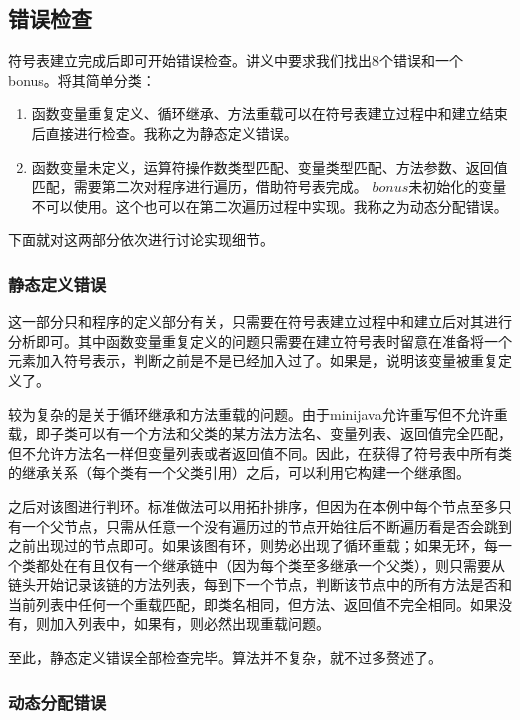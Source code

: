 \documentclass[10pt,a4paper]{article}
\begin{document}
\subsection{错误检查}

符号表建立完成后即可开始错误检查。讲义中要求我们找出8个错误和一个\\bonus。将其简单分类：
\begin{enumerate}
	\item 函数变量重复定义、循环继承、方法重载可以在符号表建立过程中和建立结束后直接进行检查。我称之为静态定义错误。
	\item 函数变量未定义，运算符操作数类型匹配、变量类型匹配、方法参数、返回值匹配，需要第二次对程序进行遍历，借助符号表完成。	\(bonus\)未初始化的变量不可以使用。这个也可以在第二次遍历过程中实现。我称之为动态分配错误。
\end{enumerate}
下面就对这两部分依次进行讨论实现细节。

\subsubsection{静态定义错误}

	这一部分只和程序的定义部分有关，只需要在符号表建立过程中和建立后对其进行分析即可。其中函数变量重复定义的问题只需要在建立符号表时留意在准备将一个元素加入符号表示，判断之前是不是已经加入过了。如果是，说明该变量被重复定义了。
	
	较为复杂的是关于循环继承和方法重载的问题。由于minijava允许重写但不允许重载，即子类可以有一个方法和父类的某方法方法名、变量列表、返回值完全匹配，但不允许方法名一样但变量列表或者返回值不同。因此，在获得了符号表中所有类的继承关系（每个类有一个父类引用）之后，可以利用它构建一个继承图。
	
	之后对该图进行判环。标准做法可以用拓扑排序，但因为在本例中每个节点至多只有一个父节点，只需从任意一个没有遍历过的节点开始往后不断遍历看是否会跳到之前出现过的节点即可。如果该图有环，则势必出现了循环重载；如果无环，每一个类都处在有且仅有一个继承链中（因为每个类至多继承一个父类），则只需要从链头开始记录该链的方法列表，每到下一个节点，判断该节点中的所有方法是否和当前列表中任何一个重载匹配，即类名相同，但方法、返回值不完全相同。如果没有，则加入列表中，如果有，则必然出现重载问题。
	
	至此，静态定义错误全部检查完毕。算法并不复杂，就不过多赘述了。

\subsubsection{动态分配错误}
	
\end{document}
